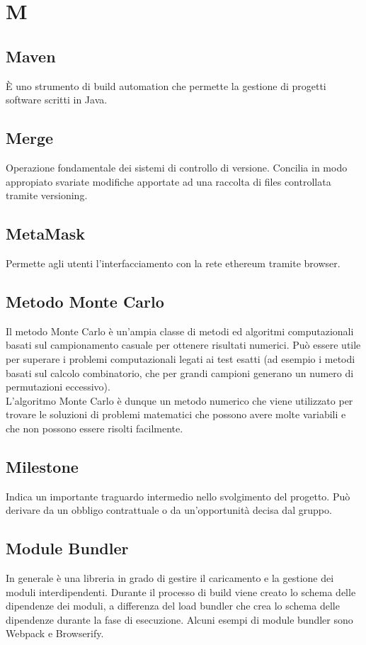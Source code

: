 \section*{M}

\subsection{Maven}
È uno strumento di build automation che permette la gestione di progetti software scritti in Java.

\subsection{Merge} 
Operazione fondamentale dei sistemi di controllo di versione. Concilia in modo appropiato svariate modifiche apportate ad una raccolta di files controllata tramite versioning.

\subsection{MetaMask}
Permette agli utenti l'interfacciamento con la rete ethereum tramite browser.

\subsection{Metodo Monte Carlo}
Il metodo Monte Carlo è un'ampia classe di metodi ed algoritmi computazionali basati sul campionamento casuale per ottenere risultati numerici. Può essere utile per superare i problemi computazionali legati ai test esatti (ad esempio i metodi basati sul calcolo combinatorio, che per grandi campioni generano un numero di permutazioni eccessivo).\\
L'algoritmo Monte Carlo è dunque un metodo numerico che viene utilizzato per trovare le soluzioni di problemi matematici che possono avere molte variabili e che non possono essere risolti facilmente.


\subsection{Milestone} 
Indica un importante traguardo intermedio nello svolgimento del progetto. Può derivare da un obbligo contrattuale o da un'opportunità decisa dal gruppo.

\subsection{Module Bundler}
In generale è una libreria in grado di gestire il caricamento e la gestione dei moduli interdipendenti. Durante il processo di build viene creato lo schema delle dipendenze dei moduli, a differenza del load bundler che crea lo schema delle dipendenze durante la fase di esecuzione. Alcuni esempi di module bundler sono Webpack e Browserify.

